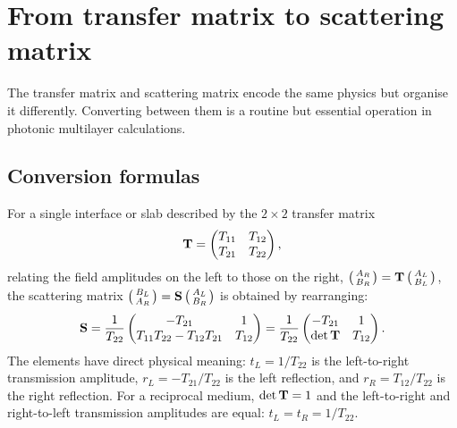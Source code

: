 \section{From transfer matrix to scattering matrix}
\label{sec:t-to-s}

The transfer matrix and scattering matrix encode the same physics but
organise it differently. Converting between them is a routine but
essential operation in photonic multilayer calculations.

\subsection{Conversion formulas}
\label{ssec:ts-conversion}

For a single interface or slab described by the $2\times 2$ transfer
matrix
\begin{equation}
 \mathbf{T} = \begin{pmatrix} T_{11} & T_{12} \\ T_{21} & T_{22} \end{pmatrix},
 \label{eq:transfer-generic}
\end{equation}
relating the field amplitudes on the left to those on the right,
$\bigl(\begin{smallmatrix} A_R \\ B_R \end{smallmatrix}\bigr)
= \mathbf{T}\,\bigl(\begin{smallmatrix} A_L \\ B_L \end{smallmatrix}\bigr)$,
the scattering matrix
$\bigl(\begin{smallmatrix} B_L \\ A_R \end{smallmatrix}\bigr)
= \mathbf{S}\,\bigl(\begin{smallmatrix} A_L \\ B_R \end{smallmatrix}\bigr)$
is obtained by rearranging:
\begin{equation}
 \mathbf{S} = \frac{1}{T_{22}}
 \begin{pmatrix}
 -T_{21} & 1 \\
 T_{11}T_{22} - T_{12}T_{21} & T_{12}
 \end{pmatrix}
 = \frac{1}{T_{22}}
 \begin{pmatrix}
 -T_{21} & 1 \\
 \det\mathbf{T} & T_{12}
 \end{pmatrix}.
 \label{eq:t-to-s}
\end{equation}
The elements have direct physical meaning:
$t_L = 1/T_{22}$ is the left-to-right transmission amplitude,
$r_L = -T_{21}/T_{22}$ is the left reflection, and
$r_R = T_{12}/T_{22}$ is the right reflection. For a reciprocal
medium, $\det\mathbf{T} = 1$ and the left-to-right and right-to-left
transmission amplitudes are equal: $t_L = t_R = 1/T_{22}$.

